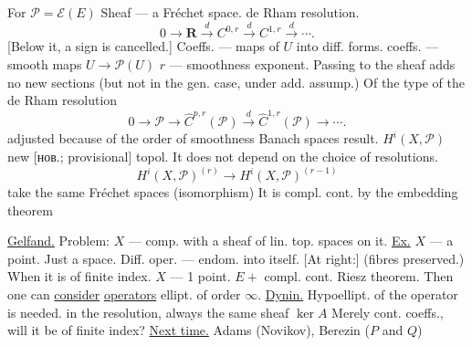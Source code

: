 For $\mathcal P=\mathcal E(E)$ Sheaf --- a Fréchet space.
de Rham resolution.
\begin{equation*}
0\longrightarrow\mathbf R\overset d{\longrightarrow}C^{0,r}
\overset d{\longrightarrow}C^{1,r}\overset d{\longrightarrow}\cdots.
\end{equation*}
[Below it, a sign is cancelled.]
Coeffs. --- maps of $U$ into diff. forms.
coeffs. --- smooth maps $U\longrightarrow\mathcal P(U)$
$r$ --- smoothness exponent.
Passing to the sheaf adds no new sections (but not in the gen. case, under add. assump.)
Of the type of the de Rham resolution
\begin{equation*}
0\longrightarrow\mathcal P\longrightarrow\widehat C^{p,r}(\mathcal P)
\overset d{\longrightarrow}\widehat C^{1,r}(\mathcal P)\longrightarrow\cdots.
\end{equation*}
adjusted because of the order of smoothness
Banach spaces result.
$H^i(X,\mathcal P)$ new [нов.; provisional] topol.
It does not depend on the choice of resolutions.
\begin{equation*}
H^i(X,\mathcal P)^{(r)}\longrightarrow H^i(X,\mathcal P)^{(r-1)}
\end{equation*}
take the same Fréchet spaces (isomorphism)
It is compl. cont. by the embedding theorem

\underline{Gelfand.} Problem: $X$ --- comp. with a sheaf of lin. top. spaces on it.
\underline{Ex.} $X$ --- a point. Just a space.
Diff. oper. --- endom. into itself.
[At right:] (fibres preserved.)
When it is of finite index.
$X$ --- 1 point. $E+$ compl. cont. Riesz theorem.
Then one can \underline{consider} \underline{operators} ellipt. of order $\infty$.
\underline{Dynin.}
Hypoellipt. of the operator is needed. in the resolution, always the same sheaf $\ker A$
Merely cont. coeffs., will it be of finite index?
\underline{Next time.} Adams (Novikov), Berezin ($P$ and $Q$)

